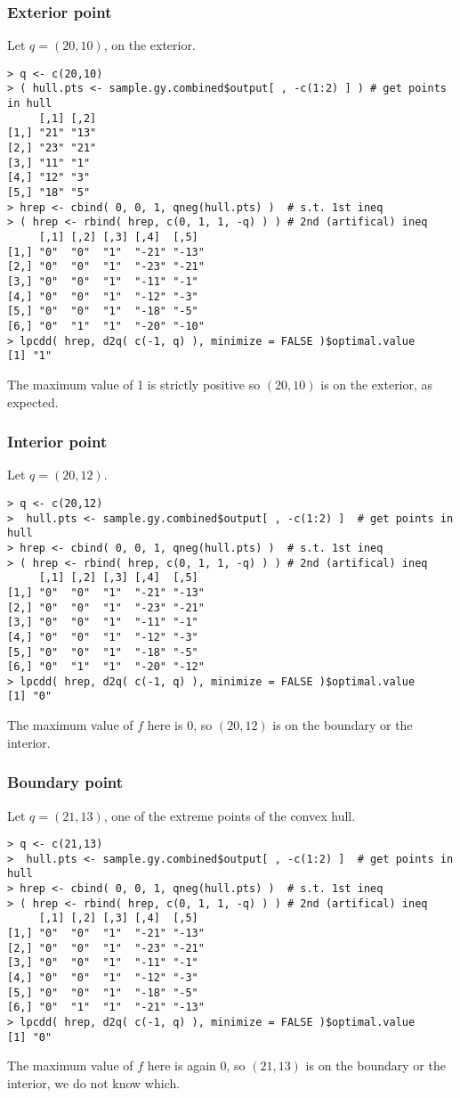 \subsubsection{Exterior point}
Let $q = (20,10)$, on the exterior.
\begin{verbatim}
> q <- c(20,10) 
> ( hull.pts <- sample.gy.combined$output[ , -c(1:2) ] ) # get points in hull
     [,1] [,2]
[1,] "21" "13"
[2,] "23" "21"
[3,] "11" "1" 
[4,] "12" "3" 
[5,] "18" "5" 
> hrep <- cbind( 0, 0, 1, qneg(hull.pts) )	# s.t. 1st ineq
> ( hrep <- rbind( hrep, c(0, 1, 1, -q) ) )	# 2nd (artifical) ineq
     [,1] [,2] [,3] [,4]  [,5] 
[1,] "0"  "0"  "1"  "-21" "-13"
[2,] "0"  "0"  "1"  "-23" "-21"
[3,] "0"  "0"  "1"  "-11" "-1" 
[4,] "0"  "0"  "1"  "-12" "-3" 
[5,] "0"  "0"  "1"  "-18" "-5" 
[6,] "0"  "1"  "1"  "-20" "-10"
> lpcdd( hrep, d2q( c(-1, q) ), minimize = FALSE )$optimal.value
[1] "1"
\end{verbatim}
The maximum value of 1 is strictly positive so $(20,10)$ is on the exterior, as expected.
\subsubsection{Interior point}
Let $q = (20,12)$.
\begin{verbatim}
> q <- c(20,12) 
>  hull.pts <- sample.gy.combined$output[ , -c(1:2) ]  # get points in hull
> hrep <- cbind( 0, 0, 1, qneg(hull.pts) )	# s.t. 1st ineq
> ( hrep <- rbind( hrep, c(0, 1, 1, -q) ) )	# 2nd (artifical) ineq
     [,1] [,2] [,3] [,4]  [,5] 
[1,] "0"  "0"  "1"  "-21" "-13"
[2,] "0"  "0"  "1"  "-23" "-21"
[3,] "0"  "0"  "1"  "-11" "-1" 
[4,] "0"  "0"  "1"  "-12" "-3" 
[5,] "0"  "0"  "1"  "-18" "-5" 
[6,] "0"  "1"  "1"  "-20" "-12"
> lpcdd( hrep, d2q( c(-1, q) ), minimize = FALSE )$optimal.value
[1] "0"
\end{verbatim}
The maximum value of $f$ here is 0, so $(20,12)$ is on the boundary or the interior.
\subsubsection{Boundary point}
Let $q = (21,13)$, one of the extreme points of the convex hull.
\begin{verbatim}
> q <- c(21,13) 
>  hull.pts <- sample.gy.combined$output[ , -c(1:2) ]  # get points in hull
> hrep <- cbind( 0, 0, 1, qneg(hull.pts) )	# s.t. 1st ineq
> ( hrep <- rbind( hrep, c(0, 1, 1, -q) ) )	# 2nd (artifical) ineq
     [,1] [,2] [,3] [,4]  [,5] 
[1,] "0"  "0"  "1"  "-21" "-13"
[2,] "0"  "0"  "1"  "-23" "-21"
[3,] "0"  "0"  "1"  "-11" "-1" 
[4,] "0"  "0"  "1"  "-12" "-3" 
[5,] "0"  "0"  "1"  "-18" "-5" 
[6,] "0"  "1"  "1"  "-21" "-13"
> lpcdd( hrep, d2q( c(-1, q) ), minimize = FALSE )$optimal.value
[1] "0"
\end{verbatim}
The maximum value of $f$ here is again 0, so $(21,13)$ is on the boundary or the interior, we do not know which.  


